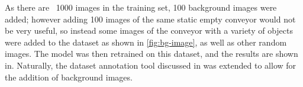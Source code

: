   As there are ~1000 images in the training set, 100 background images were added; however adding 100 images of the same static empty conveyor would not be very useful, so instead some images of the conveyor with a variety of objects were added to the dataset as shown in \autoref{fig:bg-image}, as well as other random images. The model was then retrained on this dataset, and the results are shown in. Naturally, the dataset annotation tool discussed in \label{sec:data-annotation-tool} was extended to allow for the addition of background images.
  

